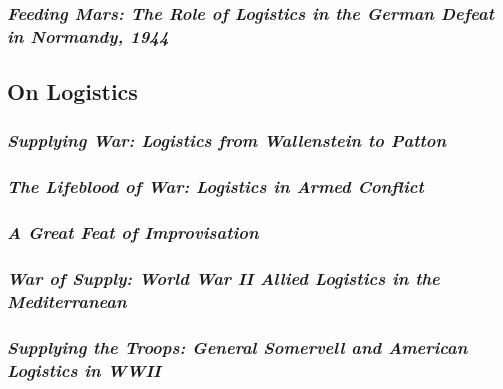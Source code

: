 \documentclass[noraggedright]{turabian-researchpaper}
\begin{document}
		\subsubsection{\textit{Feeding Mars:  The Role of Logistics
			in the German Defeat in Normandy, 1944}}

	\subsection{On Logistics}


		\subsubsection{\textit{Supplying War:  Logistics from
			Wallenstein to Patton}}
		\subsubsection{\textit{The Lifeblood of War: Logistics in
			Armed Conflict}}
		\subsubsection{\textit{A Great Feat of Improvisation}}


		\subsubsection{\textit{War of Supply:  World War II Allied
			Logistics in the Mediterranean}}
		\subsubsection{\textit{Supplying the Troops:  General 
			Somervell and American Logistics in WWII}}
\end{document}
